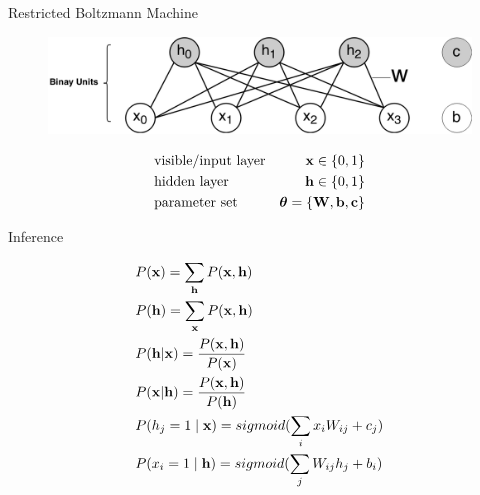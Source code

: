 	\begin{frame}[t]{Restricted Boltzmann Machine}
	    \begin{figure}[t]
		\includegraphics[width=0.9\linewidth]{RBMStruct.png}
	    \end{figure}
	    {\begin{align}
	      &\text{visible/input layer} &\mathbf{x} \in \{0,1\}\nonumber\\
	      &\text{hidden layer} &\mathbf{h} \in \{0,1\}\nonumber\\
	      &\text{parameter set} &\boldsymbol{\theta} = \{\mathbf{W},\mathbf{b},\mathbf{c}\}\nonumber
	     \end{align}

	    }
	\end{frame}
	
	\begin{frame}[t]{Inference}
		\begin{minipage}[t]{0.48\linewidth}

			 \begin{align}
			 &P(\mathbf{x}) = \sum_{\mathbf{h}} P(\mathbf{x,h})\nonumber\\ 
			 &P (\mathbf{h}) = \sum_{\mathbf{x}} P(\mathbf{x,h})\nonumber\\
			 &P (\mathbf{h}|\mathbf{x})= \dfrac{P(\mathbf{x},\mathbf{h})}{P(\mathbf{x})}\nonumber\\
			 &P(\mathbf{x}|\mathbf{h})= \dfrac{P(\mathbf{x},\mathbf{h})}{P(\mathbf{h})}\nonumber\\
			 &P(h_{j}=1 \mid \mathbf{x})= sigmoid(\sum_{i} x_{i}W_{ij} + c_{j})\nonumber\\
			 &P(x_{i}=1 \mid \mathbf{h}) = sigmoid(\sum_{j} W_{ij} h_{j} + b_{i})\nonumber
			 \end{align}
		 \end{minipage}
	\end{frame}
